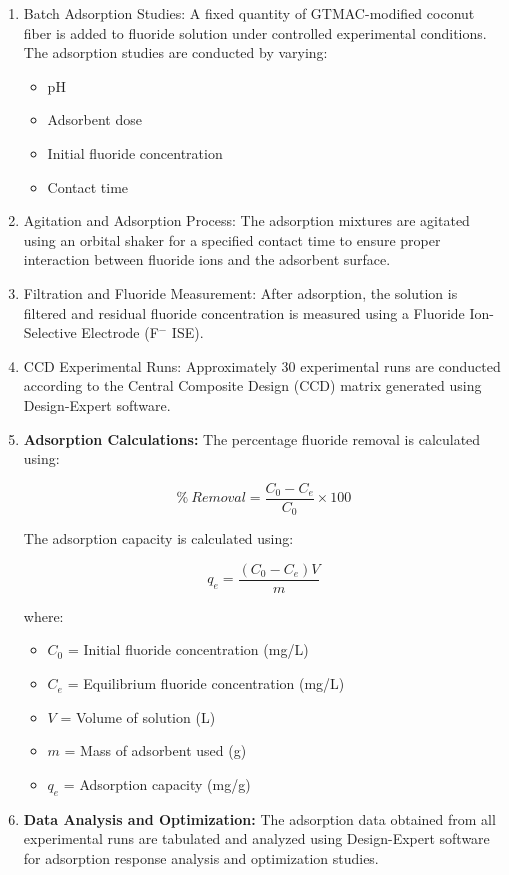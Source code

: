 \begin{enumerate}
\item Batch Adsorption Studies: A fixed quantity of GTMAC-modified 
coconut fiber is added to fluoride solution under controlled experimental 
conditions. The adsorption studies are conducted by varying:
\begin{itemize}
	\item pH
	\item Adsorbent dose
	\item Initial fluoride concentration
	\item Contact time
\end{itemize}
\item Agitation and Adsorption Process: The adsorption mixtures are agitated using an orbital shaker for a specified contact time to ensure proper interaction between fluoride ions and the adsorbent surface.   
\item Filtration and Fluoride Measurement: After adsorption, the solution 
is filtered and residual fluoride concentration is measured using a Fluoride Ion-Selective Electrode (F$^{-}$ ISE).  
\item CCD Experimental Runs: Approximately 30 experimental runs are conducted according to the Central Composite Design (CCD) matrix generated using Design-Expert software.
\item \textbf{Adsorption Calculations:} The percentage fluoride removal is calculated using:

\begin{equation}
	\% \ Removal = \frac{C_0 - C_e}{C_0} \times 100
\end{equation}

The adsorption capacity is calculated using:

\begin{equation}
	q_e = \frac{(C_0 - C_e)V}{m}
\end{equation}

where:

\begin{itemize}
	\item $C_0$ = Initial fluoride concentration (mg/L)
	\item $C_e$ = Equilibrium fluoride concentration (mg/L)
	\item $V$ = Volume of solution (L)
	\item $m$ = Mass of adsorbent used (g)
	\item $q_e$ = Adsorption capacity (mg/g)
\end{itemize}

\item \textbf{Data Analysis and Optimization:} The adsorption data obtained from all experimental runs are tabulated and analyzed using Design-Expert software for adsorption response analysis and optimization studies.      
\end{enumerate}

